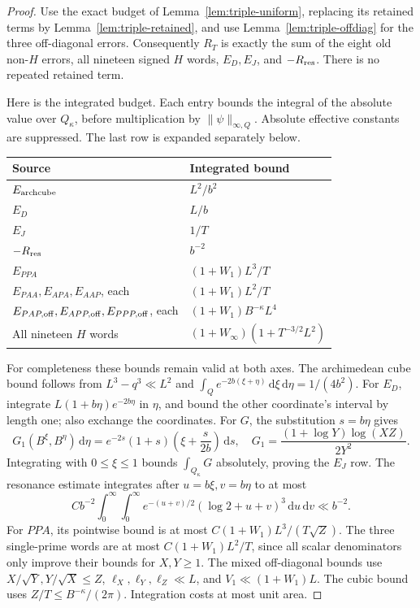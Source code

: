 \documentclass[11pt]{article}
\newcommand{\dd}{\,\mathrm d}
\begin{document}
\begin{proof}
Use the exact budget of Lemma~\ref{lem:triple-uniform}, replacing its
retained terms by Lemma~\ref{lem:triple-retained}, and use
Lemma~\ref{lem:triple-offdiag} for the three off-diagonal errors.
Consequently \(R_T\) is exactly the sum of the eight old non-\(H\)
errors, all nineteen signed \(H\) words, \(E_D,E_J\), and
\(-R_{\rm res}\). There is no repeated retained term.

Here is the integrated budget. Each entry bounds the integral of the
absolute value over \(Q_\kappa\), before multiplication by
\(\|\psi\|_{\infty,Q}\). Absolute effective constants are suppressed.
The last row is expanded separately below.
\begin{center}
\begin{tabular}{ll}
\toprule
Source & Integrated bound \\
\midrule
\(E_{\rm archcube}\) & \(L^2/b^2\) \\
\(E_D\) & \(L/b\) \\
\(E_J\) & \(1/T\) \\
\(-R_{\rm res}\) & \(b^{-2}\) \\
\(E_{PPA}\) & \((1+W_1)L^3/T\) \\
\(E_{PAA},E_{APA},E_{AAP}\), each & \((1+W_1)L^2/T\) \\
\(E_{PAP,\rm off},E_{APP,\rm off},E_{PPP,\rm off}\), each
 & \((1+W_1)B^{-\kappa}L^4\) \\
All nineteen \(H\) words & \((1+W_\infty)(1+T^{-3/2}L^2)\) \\
\bottomrule
\end{tabular}
\end{center}

For completeness these bounds remain valid at both axes. The
archimedean cube bound follows from \(L^3-q^3\ll L^2\) and
\(\int_Q e^{-2b(\xi+\eta)}\dd\xi\dd\eta=1/(4b^2)\).
For \(E_D\), integrate \(L(1+b\eta)e^{-2b\eta}\) in \(\eta\),
and bound the other coordinate's interval by length one; also exchange
the coordinates. For \(G\), the substitution \(s=b\eta\) gives
\begin{equation}\label{eq:triple-axis-substitution}
 G_1(B^\xi,B^\eta)\dd\eta
 =e^{-2s}(1+s)\left(\xi+\frac{s}{2b}\right)\dd s,
 \quad
 G_1=\frac{(1+\log Y)\log(XZ)}{2Y^2}.
\end{equation}
Integrating with \(0\leq\xi\leq1\) bounds \(\int_{Q_\kappa}G\)
absolutely, proving the \(E_J\) row. The resonance estimate integrates
after \(u=b\xi,v=b\eta\) to at most
\[
 Cb^{-2}\int_0^\infty\int_0^\infty
 e^{-(u+v)/2}(\log2+u+v)^3\dd u\dd v\ll b^{-2}.
\]
For \(PPA\), its pointwise bound is at most
\(C(1+W_1)L^3/(T\sqrt Z)\). The three single-prime words are
at most \(C(1+W_1)L^2/T\), since all scalar denominators only
improve their bounds for \(X,Y\geq1\). The mixed off-diagonal bounds
use \(X/\sqrt Y,Y/\sqrt X\leq Z\),
\(\ell_X,\ell_Y,\ell_Z\ll L\), and
\(V_1\ll(1+W_1)L\). The cubic bound uses
\(Z/T\leq B^{-\kappa}/(2\pi)\). Integration costs at most unit area.


\end{proof}
\end{document}
